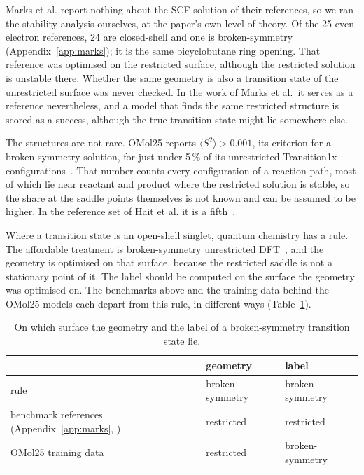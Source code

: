 Marks et al. report nothing about the SCF solution of their references,
so we ran the stability analysis ourselves, at the paper's own level of
theory. Of the 25 even-electron references, 24 are closed-shell and one
is broken-symmetry (Appendix~\ref{app:marks}); it is the same
bicyclobutane ring opening. That reference was optimised on the
restricted surface, although the restricted solution is unstable there.
Whether the same geometry is also a transition state of the
unrestricted surface was never checked. In the work of Marks et al.\ it
serves as a reference nevertheless, and a model that finds the same
restricted structure is scored as a success, although the true
transition state might lie somewhere else.

The structures are not rare. OMol25 reports $\langle S^2 \rangle >
0.001$, its criterion for a broken-symmetry solution, for just under 5\,\% of
its unrestricted Transition1x configurations~\cite{omol25}. That number counts every configuration of
a reaction path, most of which lie near reactant and product where the
restricted solution is stable, so the share at the saddle points
themselves is not known and can be assumed to be higher. In the
reference set of Hait et al. it is a fifth~\cite{hait2025}.

Where a transition state is an open-shell singlet, quantum chemistry
has a rule. The affordable treatment is broken-symmetry unrestricted
DFT~\cite{grafenstein2002, crawford2001}, and the geometry is optimised
on that surface, because the restricted saddle is not a stationary
point of it. The label should be computed on the surface the
geometry was optimised on. The
benchmarks above and the training data behind the OMol25 models each
depart from this rule, in different ways (Table~\ref{tab:surfaces}).

\begin{table}[h]
\centering
\small
\caption{On which surface the geometry and the label of a
broken-symmetry transition state lie.}
\label{tab:surfaces}
\begin{tabular}{@{}lll@{}}
\toprule
 & geometry & label \\
\midrule
rule & broken-symmetry & broken-symmetry \\
benchmark references (Appendix~\ref{app:marks}, \cite{marks2026}) & restricted & restricted \\
OMol25 training data~\cite{omol25} & restricted & broken-symmetry \\
\bottomrule
\end{tabular}
\end{table}

